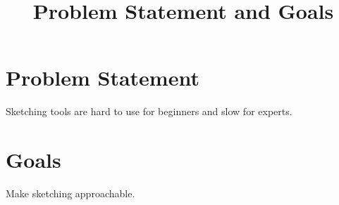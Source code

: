 \documentclass{article}
\title{Problem Statement and Goals\\\progname}
\author{\authname}
\begin{document}
\maketitle
\section{Problem Statement}
Sketching tools are hard to use for beginners and slow for experts.
\section{Goals}
Make sketching approachable.
\end{document}
